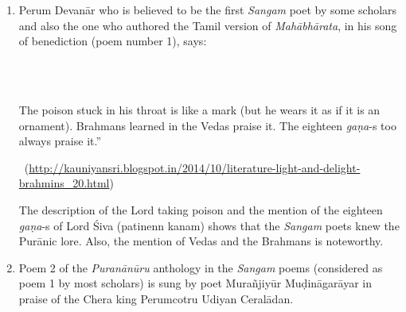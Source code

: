 \begin{enumerate}[{\rm 1.}]
\itemsep=0pt
\item 
 Perum Devanār who is believed to be the first \textit{Sangam} poet by some scholars and also the one who authored the Tamil version of \textit{Mahābhārata}, in his song of benediction (poem number 1), says:

\begin{myquote}
\\\\
\end{myquote}

\begin{myquote}
The poison stuck in his throat is like a mark (but he wears it as if it is an ornament). Brahmans learned in the Vedas praise it. The eighteen \textit{gaṇa}-s too always praise it.”

~\hfill (\url{http://kauniyansri.blogspot.in/2014/10/literature-light-and-delight-brahmins_20.html})
\end{myquote}

 The description of the Lord taking poison and the mention of the eighteen \textit{gaṇa}-s of Lord Śiva (patinenn kanam) shows that the \textit{Sangam} poets knew the Purānic lore. Also, the mention of Vedas and the Brahmans is noteworthy.

 \item 
 Poem 2 of the \textit{Puranānūru} anthology in the \textit{Sangam} poems (considered as poem 1 by most scholars) is sung by poet Murañjiyūr Muḍināgarāyar in praise of the Chera king Perumcotru Udiyan Ceralādan.

\begin{myquote}
\\\\\\


\end{myquote}
\end{enumerate}
